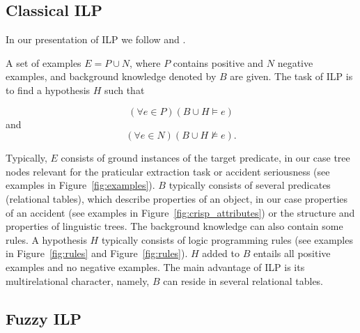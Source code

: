 
\subsection{Classical ILP} \label{sec:third_ILP_classic}

In our presentation of ILP we follow \cite{dzeroski2001:relat_dm} and  \cite{biblio:Muggleton94inductivelogic}.


\begin{definition}
A set of examples $E=P\cup N$, where $P$ contains positive and $N$ negative examples, and background knowledge denoted by $B$ are given. The task of ILP is to find a hypothesis $H$ such that 

$$
(\forall e\in P)(B\cup H\models e)
$$
and
$$
(\forall e\in N)(B\cup H\not\models e).
$$
\end{definition}
Typically, $E$ consists of ground instances of the target predicate, in our case tree nodes relevant for the praticular extraction task or accident seriousness (see examples in Figure~\ref{fig:examples}). $B$ typically consists of several predicates (relational tables), which describe properties of an object, in our case properties of an accident (see examples in Figure~\ref{fig:crisp_attributes}) or the structure and properties of linguistic trees. The background knowledge can also contain some rules. A hypothesis $H$ typically consists of logic programming rules (see examples in Figure~\ref{fig:rules} and Figure~\ref{fig:rules}). $H$ added to $B$ entails all positive examples and no negative examples.
%
The main advantage of ILP is its multirelational character, namely, $B$ can reside in several relational tables.





\subsection{Fuzzy ILP}

